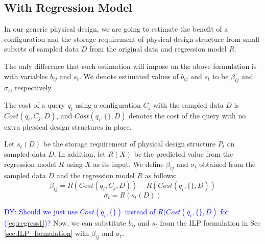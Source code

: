 \documentclass[10pt]{article}
\newcommand{\dy}[1]{\textcolor{blue}{DY: #1}}
\begin{document}
\subsection{With Regression Model}
In our generic physical design, we are going to estimate the benefit of a configuration and the
storage requirement of physical design structure from small subsets of sampled data $D$ from the
original data and regression model $R$.

The only difference that such estimation will impose on the above formulation is with variables
$b_{ij}$ and $s_{t}$. We denote estimated values of $b_{ij}$ and $s_{t}$ to be $\beta_{ij}$ and
$\sigma_{t}$, respectively.

The cost of a query $q_i$ using a configuration $C_j$ with the sampled data $D$ is
$Cost(q_i, C_j, D)$, and $Cost(q_i, \{\}, D)$
denotes the cost of the query with no extra physical design structures in place.

Let $s_t (D)$ be the storage requirement of physical design structure $P_t$ on sampled data $D$.
In addition, let $R(X)$ be the predicted value from the regression model $R$ using $X$ as its input.
We define $\beta_{ij}$ and $\sigma_{t}$ obtained from the sampled data $D$ and the regression model
$R$ as follows:
\begin{equation}
  \beta_{ij} = R(Cost(q_i, C_j, D)) - R(Cost(q_i, \{\}, D))
  \label{eq:regress1}
\end{equation}
\begin{equation}
  \sigma_{t} = R(s_t (D))
\end{equation}

\dy{Should we just use $Cost(q_i, \{\})$ instead of $R(Cost(q_i, \{\}, D)$ for (\ref{eq:regress1})?}
Now, we can substitute $b_{ij}$ and $s_t$ from the ILP formulation in Sec \ref{sec:ILP_formulation}
with $\beta_{ij}$ and $\sigma_{t}$.



\end{document}
